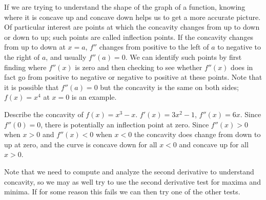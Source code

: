 If we are trying to understand the shape of the graph of a function,
knowing where it is concave up and concave down helps us to get a more
accurate picture. Of particular interest are points at which the
concavity changes from up to down or down to up; such points are
called {\dfont inflection points.} If the
concavity changes from up to down at $x=a$, $f''$ changes from
positive to the left of $a$ to negative to the right of $a$, and
usually $f''(a)=0$. We can identify such points by first finding where
$f''(x)$ is zero and then checking to see whether $f''(x)$ does in
fact go from positive to negative or negative to positive at these
points. Note that it is possible that $f''(a)=0$ but the concavity is
the same on both sides; $f(x)=x^4$ at $x=0$ is an example.

\begin{example}
Describe the concavity of $f(x)=x^3-x$. $f'(x)=3x^2-1$, $f''(x)=6x$.
Since $f''(0)=0$, there is potentially an inflection point at
zero. Since $f''(x)>0$ when $x>0$ and $f''(x)<0$ when $x<0$ the
concavity does change from down to up at zero, and the curve is
concave down for all $x<0$ and concave up for all $x>0$.
\end{example}

Note that we need to compute and analyze the second derivative to
understand concavity, so we may as well try to use the second
derivative test for maxima and minima. If for some reason this fails
we can then try one of the other tests.

